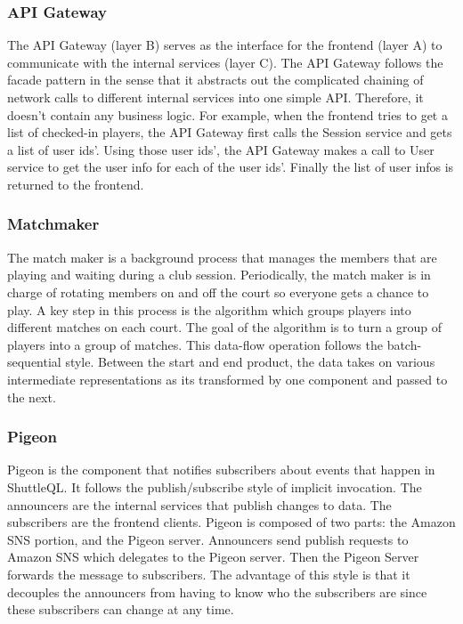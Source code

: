 \documentclass{article}
\begin{document}
\subsubsection{API Gateway}
The API Gateway (layer B) serves as the interface for the frontend (layer A) to communicate with the internal services (layer C). The API Gateway follows the facade pattern in the sense that it abstracts out the complicated chaining of network calls to different internal services into one simple API. Therefore, it doesn't contain any business logic.
For example, when the frontend tries to get a list of checked-in players, the API Gateway first calls the Session service and gets a list of user ids'. Using those user ids', the API Gateway makes a call to User service to get the user info for each of the user ids'. Finally the list of user infos is returned to the frontend.

\subsubsection{Matchmaker}
The match maker is a background process that manages the members that are playing and waiting during a club session. Periodically, the match maker is in charge of rotating members on and off the court so everyone gets a chance to play. A key step in this process is the algorithm which groups players into different matches on each court. The goal of the algorithm is to turn a group of players into a group of matches. This data-flow operation follows the batch-sequential style. Between the start and end product, the data takes on various intermediate representations as its transformed by one component and passed to the next.

\subsubsection{Pigeon}
Pigeon is the component that notifies subscribers about events that happen in ShuttleQL. It follows the publish/subscribe style of implicit invocation. The announcers are the internal services that publish changes to data. The subscribers are the frontend clients. Pigeon is composed of two parts: the Amazon SNS portion, and the Pigeon server. Announcers send publish requests to Amazon SNS which delegates to the Pigeon server. Then the Pigeon Server forwards the message to subscribers. The advantage of this style is that it decouples the announcers from having to know who the subscribers are since these subscribers can change at any time.
\end{document}

